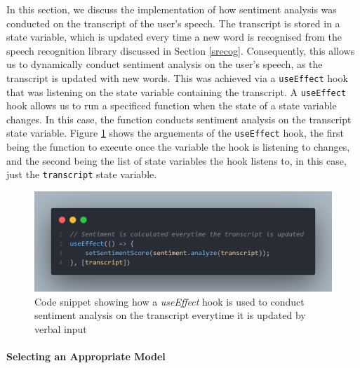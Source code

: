 \documentclass[12pt, a4paper]{article}
\newcommand{\np}
    {
    \vskip 0.4cm
    }
\begin{document}
In this section, we discuss the implementation of how sentiment analysis was conducted on the transcript of the user's speech. The transcript is stored in a state variable, which is updated every time a new word is recognised from the speech recognition library discussed in Section \ref{srecog}. Consequently, this allows us to dynamically conduct sentiment analysis on the user's speech, as the transcript is updated with new words. This was achieved via a \verb+useEffect+ hook that was listening on the state variable containing the transcript. A \verb+useEffect+ hook allows us to run a specificed function when the state of a state variable changes. In this case, the function conducts sentiment analysis on the transcript state variable. Figure \ref{fig:codesa} shows the arguements of the \verb+useEffect+ hook, the first being the function to execute once the variable the hook is listening to changes, and the second being the list of state variables the hook listens to, in this case, just the \verb+transcript+ state variable.
\np
\begin{figure}[H]
    \centering
    \includegraphics[scale=0.28]{images/codesa.png}
    \caption{Code snippet showing how a \textit{useEffect} hook is used to conduct sentiment analysis on the transcript everytime it is updated by verbal input}
    \label{fig:codesa}
\end{figure}

\paragraph{Selecting an Appropriate Model}
\label{saam}
\end{document}
